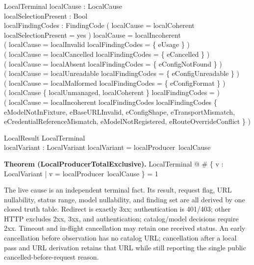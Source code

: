 \documentclass{article}
\makeatletter
\newenvironment{theorem}[1]{\medskip\noindent\textbf{Theorem (#1).}\@nameuse{zed}}{\@nameuse{endzed}}
\makeatother
\begin{document}
\begin{schema}{LocalTerminal}
	localCause : LocalCause \\
	localSelectionPresent : Bool \\
	localFindingCodes : \power FindingCode
	\where
	( localCause = localCoherent \iff localSelectionPresent = yes ) \lor
	localCause = localIncoherent \\
	( localCause = localInvalid \implies localFindingCodes = \{ eUsage \} ) \\
	( localCause = localCancelled \implies localFindingCodes = \{ eCancelled \} ) \\
	( localCause = localAbsent \implies localFindingCodes = \{ eConfigNotFound \} ) \\
	( localCause = localUnreadable \implies
	localFindingCodes = \{ eConfigUnreadable \} ) \\
	( localCause = localMalformed \implies localFindingCodes = \{ eConfigFormat \} ) \\
	( localCause \in \{ localUnmanaged, localCoherent \} \implies
	localFindingCodes = \emptyset ) \\
	( localCause = localIncoherent \implies localFindingCodes \neq \emptyset \land
	localFindingCodes \subseteq \{ eModelNotInFixture, eBaseURLInvalid,
	eConfigShape, eTransportMismatch, eCredentialReferenceMismatch,
	eModelNotRegistered, eRouteOverrideConflict \} )
\end{schema}

\begin{schema}{LocalResult}
	LocalTerminal \\
	localVariant : LocalVariant
	\where
	localVariant = localProducer~localCause
\end{schema}

\begin{theorem}{LocalProducerTotalExclusive}
	\forall LocalTerminal @
	\# \{ v : LocalVariant | v = localProducer~localCause \} = 1
\end{theorem}

The live cause is an independent terminal fact.  Its result, request flag, URL
nullability, status range, model nullability, and finding set are all derived by
one closed truth table.  Redirect is exactly 3xx; authentication is 401/403;
other HTTP excludes 2xx, 3xx, and authentication; catalog/model decisions require
2xx.  Timeout and in-flight cancellation may retain one received status.  An
early cancellation before observation has no catalog URL; cancellation after a
local pass and URL derivation retains that URL while still reporting the single
public cancelled-before-request reason.
\end{document}
